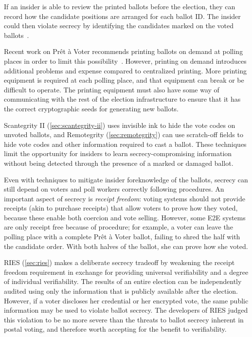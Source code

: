 If an insider is able to review the printed ballots before the
election, they can record how the candidate positions are arranged for
each ballot ID. The insider could then violate secrecy by identifying
the candidates marked on the voted ballots~\cite{burton2012}.

Recent work on Prêt à Voter recommends printing ballots on demand at
polling places in order to limit this
possibility~\cite{ryan2009}. However, printing on demand introduces
additional problems and expense compared to centralized printing. More
printing equipment is required at each polling place, and that
equipment can break or be difficult to operate. The printing equipment
must also have some way of communicating with the rest of the election
infrastructure to ensure that it has the correct cryptographic seeds
for generating new ballots.

Scantegrity II (\autoref{sec:scantegrity-ii}) uses invisible ink to
hide the vote codes on unvoted ballots, and Remotegrity
(\autoref{sec:remotegrity}) can use scratch-off fields to hide vote
codes and other information required to cast a ballot. These
techniques limit the opportunity for insiders to learn
secrecy-compromising information without being detected through the
presence of a marked or damaged ballot.

Even with techniques to mitigate insider foreknowledge of the ballots,
secrecy can still depend on voters and poll workers correctly
following procedures. An important aspect of secrecy is \emph{receipt
  freedom}: voting systems should not provide receipts (akin to
purchase receipts) that allow voters to prove how they voted, because
these enable both coercion and vote selling. However, some E2E systems
are only receipt free because of procedure; for example, a voter can
leave the polling place with a complete Prêt à Voter ballot, failing
to shred the half with the candidate order. With both halves of the
ballot, she can prove how she voted.

RIES (\autoref{sec:ries}) makes a deliberate secrecy tradeoff by
weakening the receipt freedom requirement in exchange for providing
universal verifiability and a degree of individual verifiability. The
results of an entire election can be independently audited using only
the information that is publicly available after the
election. However, if a voter discloses her credential or her
encrypted vote, the same public information may be used to violate
ballot secrecy. The developers of RIES judged this violation to be no
more severe than the threats to ballot secrecy inherent in postal
voting, and therefore worth accepting for the benefit to
verifiability.


